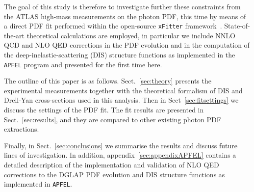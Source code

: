 The goal of this study is therefore to investigate further these
constraints from the ATLAS high-mass measurements on the photon PDF,
this time by means of a direct PDF fit performed within the
open-source {\tt xFitter} framework~\cite{Alekhin:2014irh}.
%
State-of-the-art theoretical calculations are employed, in particular
we include NNLO QCD and NLO QED corrections in the PDF evolution and
in the computation of the deep-inelastic-scattering (DIS) structure
functions as implemented in the {\tt APFEL} program and presented for
the first time here.
%


The outline of this paper is as follows.
%
Sect.~\ref{sec:theory} presents the experimental measurements together
with the theoretical formalism of DIS and Drell-Yan cross-sections
used in this analysis.
%
Then in Sect~\ref{sec:fitsettings} we discuss the settings of the PDF
fit.
%
%
The fit results are presented in Sect.~\ref{sec:results}, and they are
compared to other existing photon PDF extractions.

%
Finally, in Sect.~\ref{sec:conclusions} we summarise the results and
discuss future lines of investigation.
%
In addition, appendix~\ref{sec:appendixAPFEL} contains a detailed
description of the implementation and validation of NLO QED
corrections to the DGLAP PDF evolution and DIS structure functions as
implemented in {\tt APFEL}.

